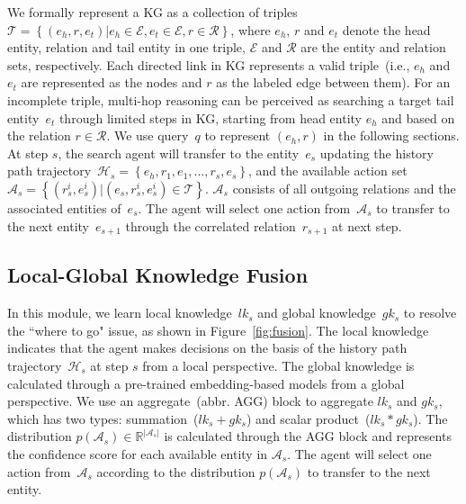 We formally represent a KG as a collection of triples~$\mathcal{T}=\left \{ (e_{h},r,e_{t})|e_{h}\in \mathcal{E}, e_{t}\in \mathcal{E},r\in \mathcal{R}\right \} $, where $e_{h}$, $r$ and $e_{t}$ denote the head entity, relation and tail entity in one triple, $\mathcal{E}$ and $\mathcal{R}$ are the entity and relation sets, respectively. 
Each directed link in KG represents a valid triple~(i.e., $e_{h}$ and $e_{t}$ are represented as the nodes and $r$ as the labeled edge between them).
For an incomplete triple, multi-hop reasoning can be perceived as searching a target tail entity~$e_{t}$ through limited steps in KG, starting from head entity $e_{h}$ and based on the relation $r\in \mathcal{R}$. 
We use query~$q$ to represent $(e_{h},r)$ in the following sections.
At step $s$, the search agent will transfer to the entity~$e_{s}$ updating 
the history path trajectory~$\mathcal{H}_{s}=\left \{e_{h}, r_{1}, e_{1},..., r_{s}, e_{s}\right \}$, and the available action set  $\mathcal{A}_{s}=\left \{ ({{r_{s}^{i}}},{{e_{s}^{i}}} )|({e}_{s},{{r_{s}^{i}}},{{e_{s}^{i}}} )\in \mathcal{T}\right \}$.
$\mathcal{A}_{s}$ consists of all outgoing relations and the associated entities of~${e}_{s}$.
The agent will select one action from~$\mathcal{A}_{s}$ to transfer to the next entity~${e}_{s+1}$ through the correlated relation~${r}_{s+1}$ at next step.  




\subsection{Local-Global Knowledge Fusion}

In this module, we learn local knowledge~$lk_{s}$ and global knowledge~$gk_{s}$ to resolve the ``where to go" issue,
as shown in Figure~\ref{fig:fusion}.
The local knowledge indicates that the agent makes decisions on the basis of the history path trajectory~$\mathcal{H}_{s}$ at step $s$ from a local perspective. 
The global knowledge is calculated through a pre-trained embedding-based models from a global perspective.
We use an aggregate~(abbr. AGG) block to aggregate $lk_{s}$ and $gk_{s}$, which has two types: summation~($lk_{s}+gk_{s}$) and scalar product~($lk_{s}*gk_{s}$).
The distribution $p(\mathcal{A}_{s})\in \mathbb{R}^{\left | \mathcal{A}_{s} \right |}$ is calculated through the AGG block and represents the confidence score for each available entity in $\mathcal{A}_{s}$.
The agent will select one action from~$\mathcal{A}_{s}$ according to the distribution $p(\mathcal{A}_{s})$
to transfer to the next entity.



